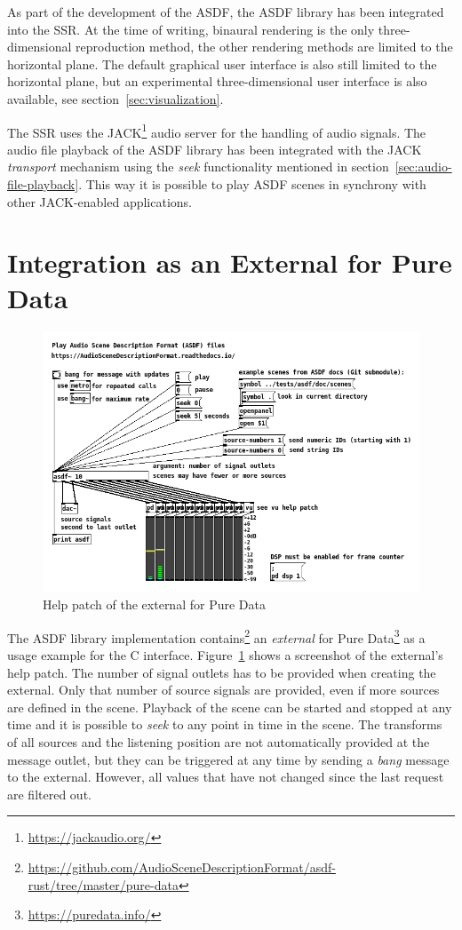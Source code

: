 As part of the development of the ASDF,
the ASDF library has been integrated into the SSR.
At the time of writing,
binaural rendering is
the only three-dimensional reproduction method,
the other rendering methods are limited to the horizontal plane.
The default graphical user interface is also still limited to the horizontal
plane,
but an experimental three-dimensional user interface is also available,
see section~\ref{sec:visualization}.

The SSR uses the JACK\footnote{\url{https://jackaudio.org/}}
audio server for the handling of audio signals.
The audio file playback of the ASDF library
has been integrated with the
JACK \emph{transport} mechanism
using the \emph{seek} functionality mentioned in
section~\ref{sec:audio-file-playback}.
This way it is possible to play ASDF scenes in synchrony
with other JACK-enabled applications.


\section{Integration as an External for Pure Data}
\label{sec:integration-pd}

\begin{figure}
\centering
\includegraphics[scale=0.5]{images/asdf-help-pure-data-screenshot}
\caption{Help patch of the \emph{} external for Pure Data}
\label{fig:asdf-help-pure-data-screenshot}
\end{figure}

The ASDF library implementation contains\footnote{%
\url{https://github.com/AudioSceneDescriptionFormat/asdf-rust/tree/master/pure-data}}
an \emph{external} for
Pure Data\footnote{\url{https://puredata.info/}}
as a usage example for the C interface.
Figure~\ref{fig:asdf-help-pure-data-screenshot}
shows a screenshot of the external's help patch.
The number of signal outlets has to be provided when creating the external.
Only that number of source signals are provided,
even if more sources are defined in the scene.
Playback of the scene can be started and stopped at any time
and it is possible to \emph{seek} to any point in time in the scene.
The transforms of all sources and the listening position
are not automatically provided at the message outlet,
but they can be triggered at any time
by sending a \emph{bang} message to the external.
However,
all values that have not changed
since the last request
are filtered out.

